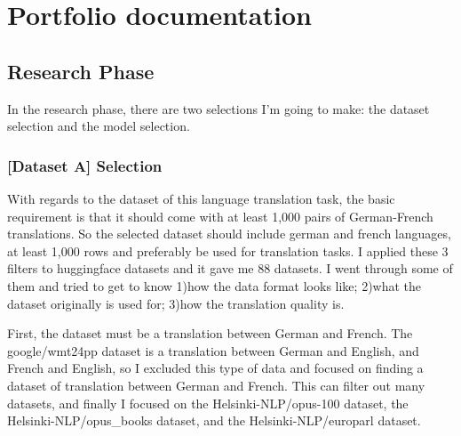 \setcounter{page}{1}
\section{Portfolio documentation}
\label{sec:documentation}



\subsection{Research Phase}
\label{subsec:research}
In the research phase, there are two selections I'm going to make: the dataset selection and the model selection.

\subsubsection{[Dataset A] Selection}
With regards to the dataset of this language translation task,
the basic requirement is that it should come with at least 1,000 pairs of German-French translations.
So the selected dataset should include german and french languages, at least 1,000 rows and preferably be used for translation tasks.
I applied these 3 filters to huggingface datasets and it gave me 88 datasets. 
I went through some of them and tried to get to know
1)how the data format looks like; 
2)what the dataset originally is used for;
3)how the translation quality is. 

First, the dataset must be a translation between German and French.
The google/wmt24pp dataset is a translation between German and English, and French and English,
so I excluded this type of data and focused on finding a dataset of translation between German and French.
This can filter out many datasets, and finally 
I focused on the Helsinki-NLP/opus-100\cite{zhang-etal-2020-improving}\cite{tiedemann-2012-parallel} dataset, 
the Helsinki-NLP/opus\_books dataset, and the Helsinki-NLP/europarl\cite{koehn-2005-europarl} dataset.

